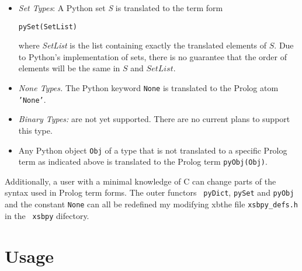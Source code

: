 \begin{itemize}
         {\tt ''(Key,Value)}

         {\tt Key} and {\tt Value} are the translations of any Python
         data structures that are both allowable as a dictionary key
         or value, and supported by {\tt xsbpy}.  For instance, {\tt
           Value} can be (the term form of) a list, a set, a tuple or
         another dictionary.

       \item {\em Set Types}: A Python set {\em S} is translated to
         the term form

         {\tt pySet(SetList)}

         where {\em SetList} is the list containing exactly the
         translated elements of $S$.  Due to Python's implementation
         of sets, there is no guarantee that the order of elements
         will be the same in $S$ and $SetList$.
       \item {\em None Types.} The Python keyword {\tt None} is
         translated to the Prolog atom {\tt 'None'}. 
       \item {\em Binary Types:} are not yet supported.  There are no
         current plans to support this type.
     \item Any Python object {\tt Obj} of a type that is not
       translated to a specific Prolog term as indicated above is
       translated to the Prolog term {\tt pyObj(Obj)}. 
\end{itemize}

Additionally, a user with a minimal knowledge of C can change parts of
the syntax used in Prolog term forms.  The outer functors {\tt
  pyDict}, {\tt pySet} and {\tt pyObj} and the constant {\tt None} can
all be redefined my modifying xbthe file {\tt xsbpy\_defs.h} in the {\tt
  xsbpy} difectory.

\section{Usage}

